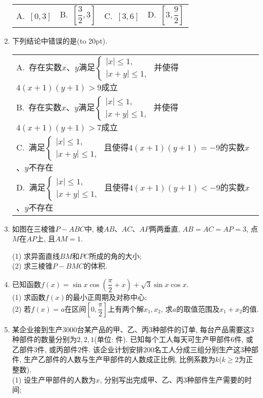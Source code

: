 \documentclass[10pt,a4paper]{article}
\newcommand{\bracket}[1]{(\hbox to #1pt{})}
\newcommand{\onech}[4]{\par\begin{tabular}{p{.9\textwidth}}
A.~#1\\
B.~#2\\
C.~#3\\
D.~#4
\end{tabular}}
\newcommand{\fourch}[4]{\par\begin{tabular}{p{.23\textwidth}p{.23\textwidth}p{.23\textwidth}p{.23\textwidth}}
A.~#1 &B.~#2& C.~#3& D.~#4
\end{tabular}}
\begin{document}
\begin{enumerate}[1.]
\fourch{$[0,3]$}{$[\dfrac 32,3]$}{$[3,6]$}{$[3,\dfrac 92]$}
\item 下列结论中错误的是\bracket{20}.
\onech{存在实数$x$、$y$满足$\begin{cases}|x|\le 1, \\|x+y|\le 1, \end{cases}$ 并使得$4(x+1)(y+1)>9$成立}{存在实数$x$、$y$满足$\begin{cases}|x|\le 1, \\|x+y|\le 1, \end{cases}$ 并使得$4(x+1)(y+1)>7$成立}{满足$\begin{cases}|x|\le 1, \\|x+y|\le 1, \end{cases}$ 且使得$4(x+1)(y+1)=-9$的实数$x$、$y$不存在}{满足$\begin{cases}|x|\le 1, \\|x+y|\le 1, \end{cases}$ 且使得$4(x+1)(y+1)<-9$的实数$x$、$y$不存在}
\item 如图在三棱锥$P-ABC$中, 棱$AB$、$AC$、$AP$两两垂直, $AB=AC=AP=3$, 点$M$在$AP$上, 且$AM=1$.
\begin{center}
\end{center}
(1) 求异面直线$BM$和$PC$所成的角的大小;\\
(2) 求三棱锥$P-BMC$的体积.
\item 已知函数$f(x)=\sin x\cos (\dfrac{\pi }2+x)+\sqrt 3\sin x\cos x$.\\
(1) 求函数$f(x)$的最小正周期及对称中心;\\
(2) 若$f(x)=a$在区间$[0,\dfrac{\pi }2]$上有两个解$x_1,x_2$, 求$a$的取值范围及$x_1+x_2$的值.
\item 某企业接到生产$3000$台某产品的甲、乙、丙$3$种部件的订单, 每台产品需要这$3$种部件的数量分别为$2, 2, 1$(单位: 件). 已知每个工人每天可生产甲部件$6$件, 或乙部件$3$件, 或丙部件$2$件. 该企业计划安排$200$名工人分成三组分别生产这$3$种部件, 生产乙部件的人数与生产甲部件的人数成正比例, 比例系数为$k$($k\ge 2$为正整数).\\
(1) 设生产甲部件的人数为$x$, 分别写出完成甲、乙、丙$3$种部件生产需要的时间;\\

\end{enumerate}
\end{document}

